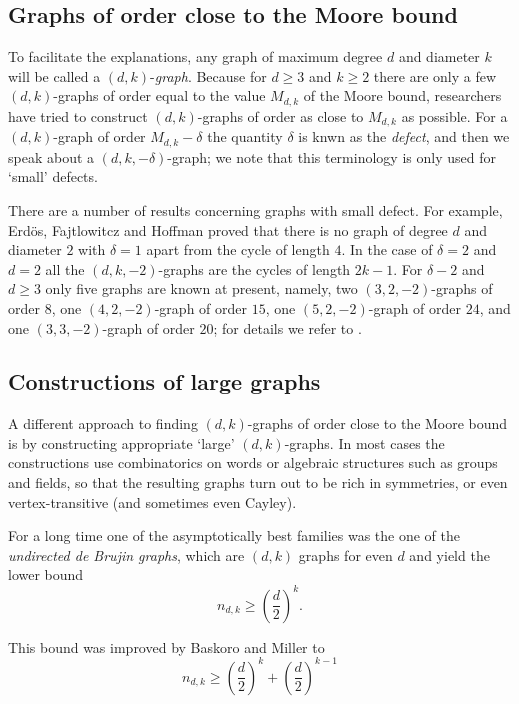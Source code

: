 \documentclass[a4paper,12pt,oneside]{report}%
\begin{document}
\subsection{Graphs of order close to the Moore bound}
To facilitate the explanations, any graph of maximum degree $d$ and diameter $k$ will be called a $(d,k)$-{\em graph}. Because for $d\ge 3$ and $k\ge 2$ there are only a few $(d,k)$-graphs of order equal to the value $M_{d,k}$ of the Moore bound, researchers have tried to construct $(d,k)$-graphs of order as close to $M_{d,k}$ as possible. For a $(d,k)$-graph of order $M_{d,k}-\delta$ the quantity $\delta$ is knwn as the {\em defect}, and then we speak about a $(d,k,-\delta)$-graph; we note that this terminology is only used for `small' defects.
\medskip

There are a number of results concerning graphs with small defect. For example, Erd\"os, Fajtlowitcz and Hoffman proved \cite{Erd-Faj} that there is no graph of degree $d$ and diameter $2$ with $\delta = 1$ apart from the cycle of length $4$. In the case of $\delta = 2$ and $d = 2$ all the $(d,k,-2)$-graphs are the cycles of length $2k-1$. For $\delta-2$ and $d \geq 3$ only five graphs are known at present, namely, two $(3,2,-2)$-graphs of order $8$, one $(4,2,-2)$-graph of order $15$, one $(5,2,-2)$-graph of order $24$, and one $(3,3,-2)$-graph of order $20$; for details we refer to \cite{Mil-Sir}.

\subsection{Constructions of large graphs}
A different approach to finding $(d,k)$-graphs of order close to the Moore bound is by constructing appropriate `large' $(d,k)$-graphs. In most cases the constructions use combinatorics on words or algebraic structures such as groups and fields, so that the resulting graphs turn out to be rich in symmetries, or even vertex-transitive (and sometimes even Cayley).
\medskip

For a long time one of the asymptotically best families was the one of the \textit{undirected de Brujin graphs}, which are $(d,k)$ graphs for even $d$ and yield the lower bound
\begin{equation*}
	n_{d,k} \geq \left( \frac{d}{2} \right)^{k}.
\end{equation*}

This bound was improved by Baskoro and Miller \cite{Bas-Mil} to
\begin{equation}
	n_{d,k} \geq \left( \frac{d}{2} \right)^{k} +  \left( \frac{d}{2} \right)^{k-1}
\end{equation}	
\end{document}

